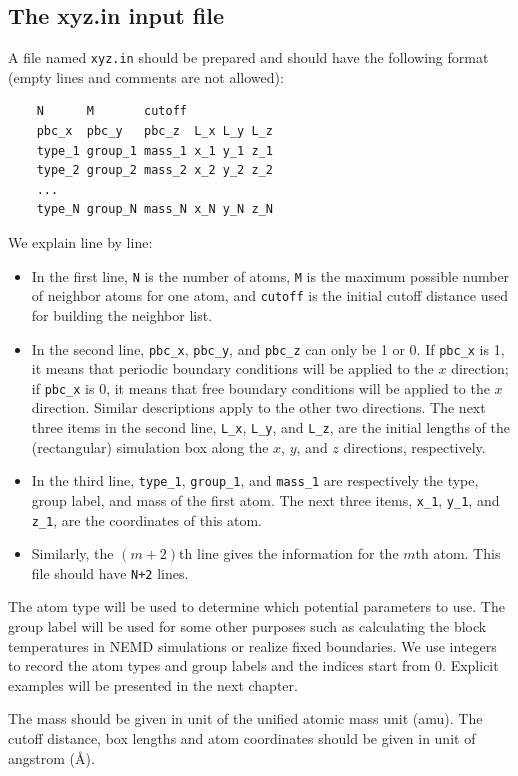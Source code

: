 \documentclass[12pt,a4paper]{report}
\begin{document}
\subsection{The xyz.in input file}

A file named \verb"xyz.in" should be prepared and should have the following format (empty lines and comments are not allowed):
\begin{verbatim}
    N      M       cutoff
    pbc_x  pbc_y   pbc_z  L_x L_y L_z
    type_1 group_1 mass_1 x_1 y_1 z_1
    type_2 group_2 mass_2 x_2 y_2 z_2
    ...
    type_N group_N mass_N x_N y_N z_N
\end{verbatim}
We explain line by line:
\begin{itemize}
\item In the first line, \verb"N" is the number of atoms, \verb"M" is the maximum possible number of neighbor atoms for one atom, and \verb"cutoff" is the initial cutoff distance used for building the neighbor list.
\item In the second line, \verb"pbc_x",  \verb"pbc_y", and \verb"pbc_z" can only be 1 or 0. If \verb"pbc_x" is 1, it means that periodic boundary conditions will be applied to the $x$ direction; if \verb"pbc_x" is 0, it means that free boundary conditions will be applied to the $x$ direction. Similar descriptions apply to the other two directions. The next three items in the second line, \verb"L_x", \verb"L_y", and \verb"L_z", are the initial lengths of the (rectangular) simulation box along the $x$, $y$, and $z$ directions, respectively.
\item In the third line, \verb"type_1", \verb"group_1", and \verb"mass_1" are respectively the type, group label, and mass of the first atom. The next three items, \verb"x_1", \verb"y_1", and \verb"z_1", are the coordinates of this atom.
\item Similarly, the $(m+2)$th line gives the information for the $m$th atom. This file should have \verb"N+2" lines.
\end{itemize}


The atom type will be used to determine which potential parameters to use. The group label will be used for some other purposes such as calculating the block temperatures in NEMD simulations or realize fixed boundaries. We use integers to record the atom types and group labels and the indices start from 0. Explicit examples will be presented in the next chapter.

The mass should be given in unit of the unified atomic mass unit (amu). The cutoff distance, box lengths and atom coordinates should be given in unit of angstrom (\AA).
\end{document}
